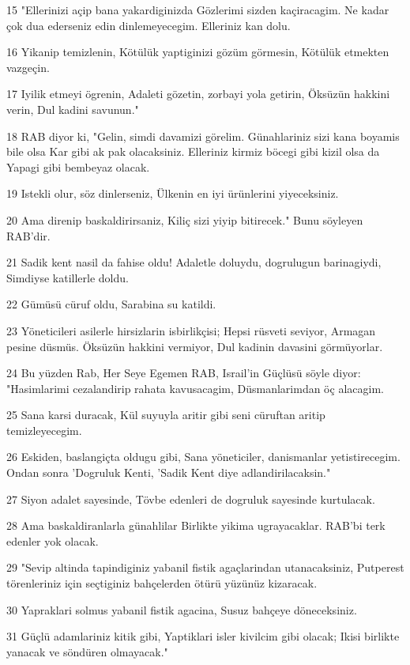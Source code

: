 \par 15 "Ellerinizi açip bana yakardiginizda Gözlerimi sizden kaçiracagim. Ne kadar çok dua ederseniz edin dinlemeyecegim. Elleriniz kan dolu.
\par 16 Yikanip temizlenin, Kötülük yaptiginizi gözüm görmesin, Kötülük etmekten vazgeçin.
\par 17 Iyilik etmeyi ögrenin, Adaleti gözetin, zorbayi yola getirin, Öksüzün hakkini verin, Dul kadini savunun."
\par 18 RAB diyor ki, "Gelin, simdi davamizi görelim. Günahlariniz sizi kana boyamis bile olsa Kar gibi ak pak olacaksiniz. Elleriniz kirmiz böcegi gibi kizil olsa da Yapagi gibi bembeyaz olacak.
\par 19 Istekli olur, söz dinlerseniz, Ülkenin en iyi ürünlerini yiyeceksiniz.
\par 20 Ama direnip baskaldirirsaniz, Kiliç sizi yiyip bitirecek." Bunu söyleyen RAB'dir.
\par 21 Sadik kent nasil da fahise oldu! Adaletle doluydu, dogrulugun barinagiydi, Simdiyse katillerle doldu.
\par 22 Gümüsü cüruf oldu, Sarabina su katildi.
\par 23 Yöneticileri asilerle hirsizlarin isbirlikçisi; Hepsi rüsveti seviyor, Armagan pesine düsmüs. Öksüzün hakkini vermiyor, Dul kadinin davasini görmüyorlar.
\par 24 Bu yüzden Rab, Her Seye Egemen RAB, Israil'in Güçlüsü söyle diyor: "Hasimlarimi cezalandirip rahata kavusacagim, Düsmanlarimdan öç alacagim.
\par 25 Sana karsi duracak, Kül suyuyla aritir gibi seni cüruftan aritip temizleyecegim.
\par 26 Eskiden, baslangiçta oldugu gibi, Sana yöneticiler, danismanlar yetistirecegim. Ondan sonra 'Dogruluk Kenti, 'Sadik Kent diye adlandirilacaksin."
\par 27 Siyon adalet sayesinde, Tövbe edenleri de dogruluk sayesinde kurtulacak.
\par 28 Ama baskaldiranlarla günahlilar Birlikte yikima ugrayacaklar. RAB'bi terk edenler yok olacak.
\par 29 "Sevip altinda tapindiginiz yabanil fistik agaçlarindan utanacaksiniz, Putperest törenleriniz için seçtiginiz bahçelerden ötürü yüzünüz kizaracak.
\par 30 Yapraklari solmus yabanil fistik agacina, Susuz bahçeye döneceksiniz.
\par 31 Güçlü adamlariniz kitik gibi, Yaptiklari isler kivilcim gibi olacak; Ikisi birlikte yanacak ve söndüren olmayacak."


